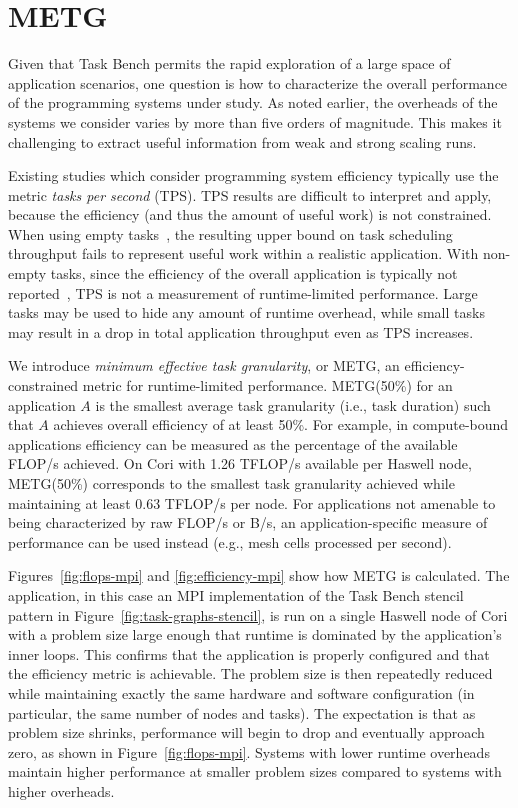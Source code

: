 \section{METG}
\label{sec:metg}

Given that Task Bench permits the rapid exploration of a large space
of application scenarios, one question is how to characterize the
overall performance of the programming systems under study. As noted
earlier, the overheads of the systems we consider varies by more than
five orders of magnitude. This makes it challenging to extract useful
information from weak and strong scaling runs.

Existing studies which consider programming system efficiency
typically use the metric \emph{tasks per second} (TPS). TPS results
are difficult to interpret and apply, because the efficiency (and thus
the amount of useful work) is not constrained. When using empty
tasks~\cite{LegionTracing18}, the resulting upper bound on task
scheduling throughput fails to represent useful work within a
realistic application. With non-empty tasks, since the efficiency of
the overall application is typically not reported~\cite{Canary16,
  Armstrong14}, TPS is not a measurement of runtime-limited
performance. Large tasks may be used to hide any amount of runtime
overhead, while small tasks may result in a drop in total application
throughput even as TPS increases.

We introduce \emph{minimum effective task granularity}, or METG, an
efficiency-constrained metric for runtime-limited
performance. METG(50\%) for an application $A$ is
the smallest average task granularity (i.e., task duration) such that $A$
achieves overall efficiency of at least 50\%. For example, in
compute-bound applications efficiency can be measured as the
percentage of the available FLOP/s achieved. On Cori with 1.26 TFLOP/s available per Haswell node, METG(50\%) corresponds to
the smallest task granularity achieved while maintaining at least 0.63
TFLOP/s per node. For applications not amenable to being characterized by raw FLOP/s or B/s, an application-specific measure of performance can be
used instead (e.g., mesh cells processed per second).




Figures~\ref{fig:flops-mpi} and \ref{fig:efficiency-mpi} show how METG is
calculated. The application, in this case an MPI implementation of the
Task Bench stencil pattern in Figure~\ref{fig:task-graphs-stencil}, is
run on a single Haswell node of Cori with a problem size large enough
that runtime is dominated by the application's inner loops. This confirms
that the application is properly configured and that the
efficiency metric is achievable. The problem
size is then repeatedly reduced while maintaining exactly the same hardware and software
configuration (in particular, the same number of nodes and tasks). The
expectation is that as problem size shrinks,
performance will begin to drop and eventually approach zero, as shown in Figure~\ref{fig:flops-mpi}. Systems
with lower runtime overheads maintain higher performance at smaller
problem sizes compared to systems with higher overheads.

